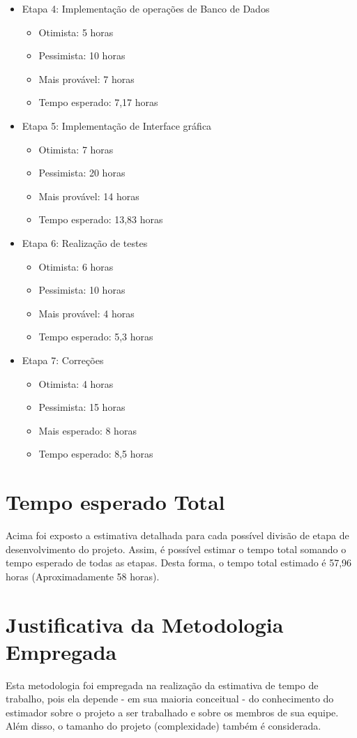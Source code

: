 \documentclass[12pt,a4paper]{report}
\begin{document}
\begin{itemize}
\begin{itemize}
		\end{itemize}
	 \item Etapa 4: Implementação de operações de Banco de Dados
			\begin{itemize}
				\item Otimista: 5 horas
				\item Pessimista: 10 horas
				\item Mais provável: 7 horas
				\item Tempo esperado: 7,17 horas
			\end{itemize}
			\item Etapa 5: Implementação de Interface gráfica
			\begin{itemize}
				\item Otimista: 7 horas
				\item Pessimista: 20 horas
				\item Mais provável: 14 horas
				\item Tempo esperado: 13,83 horas
			\end{itemize}
			\item Etapa 6: Realização de testes
			\begin{itemize}
				\item Otimista: 6 horas
				\item Pessimista: 10 horas
				\item Mais provável: 4 horas
				\item Tempo esperado: 5,3 horas
			\end{itemize}
			\item Etapa 7: Correções
			\begin{itemize}
				\item Otimista: 4 horas
				\item Pessimista: 15 horas
				\item Mais esperado: 8 horas
				\item Tempo esperado: 8,5 horas
			\end{itemize}
	\end{itemize}
	\section*{Tempo esperado Total}
	\quad Acima foi exposto a estimativa detalhada para cada possível divisão de etapa de desenvolvimento do projeto. Assim, é possível estimar o tempo total somando o tempo esperado de todas as etapas. Desta forma, o tempo total estimado é 57,96 horas (Aproximadamente 58 horas).
	\section*{Justificativa da Metodologia Empregada}
	\quad Esta metodologia foi empregada na realização da estimativa de tempo de trabalho, pois ela depende - em sua maioria conceitual - do conhecimento do estimador sobre o projeto a ser trabalhado e sobre os membros de sua equipe. Além disso, o tamanho do projeto (complexidade) também é considerada.
\end{document}
